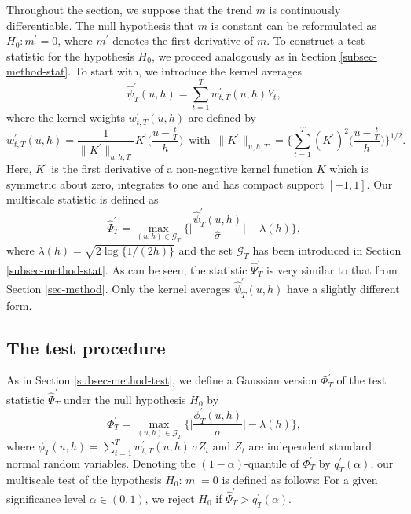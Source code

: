 \documentclass[a4paper,12pt]{article}
\numberwithin{equation}{section}
\begin{document}
Throughout the section, we suppose that the trend $m$ is continuously differentiable. The null hypothesis that $m$ is constant can be reformulated as $H_0: m^\prime = 0$, where $m^\prime$ denotes the first derivative of $m$. To construct a test statistic for the hypothesis $H_0$, we proceed analogously as in Section \ref{subsec-method-stat}. To start with, we introduce the kernel averages 
\begin{equation*}
\widehat{\psi}_T^\prime(u,h) = \sum\limits_{t=1}^T w_{t,T}^\prime(u,h) Y_t, 
\end{equation*}
where the kernel weights $w_{t,T}^\prime(u,h)$ are defined by 
\begin{equation*}
w_{t,T}^\prime(u,h) = \frac{1}{\|K^\prime\|_{u,h,T}} K^\prime\Big( \frac{u - \frac{t}{T}}{h} \Big) \, \, \, \text{with} \, \, \, \|K^\prime\|_{u,h,T} = \Big\{\sum\limits_{t=1}^T  (K^\prime)^2\Big( \frac{u - \frac{t}{T}}{h} \Big)\Big\}^{1/2}.
\end{equation*}
Here, $K^\prime$ is the first derivative of a non-negative kernel function $K$ which is symmetric about zero, integrates to one and has compact support $[-1,1]$. 
Our multiscale statistic is defined as 
\[ \widehat{\Psi}_T^\prime = \max_{(u,h) \in \mathcal{G}_T} \Big\{ \Big|\frac{\widehat{\psi}_T^\prime(u,h)}{\widehat{\sigma}}\Big| - \lambda(h) \Big\}, \] 
where $\lambda(h) = \sqrt{2 \log \{ 1/(2h) \}}$ and the set $\mathcal{G}_T$ has been introduced in Section \ref{subsec-method-stat}. As can be seen, the statistic $\widehat{\Psi}_T^\prime$ is very similar to that from Section \ref{sec-method}. Only the kernel averages $\widehat{\psi}_T^\prime(u,h)$ have a slightly different form. 


\subsection{The test procedure}\label{subsec-test-shape-test}


As in Section \ref{subsec-method-test}, we define a Gaussian version $\Phi_T^\prime$ of the test statistic $\widehat{\Psi}_T^\prime$ under the null hypothesis $H_0$ by
\[ \Phi_T^\prime = \max_{(u,h) \in \mathcal{G}_T} \Big\{ \Big|\frac{\phi_T^\prime(u,h)}{\sigma}\Big| - \lambda(h) \Big\}, \] 
where $\phi_T^\prime(u,h) = \sum\nolimits_{t=1}^T w_{t,T}^\prime(u,h) \, \sigma Z_t$ and $Z_t$ are independent standard normal random variables. Denoting the $(1-\alpha)$-quantile of $\Phi_T^\prime$ by $q_T^\prime(\alpha)$, our multiscale test of the hypothesis $H_0$: $m^\prime = 0$ is defined as follows: For a given significance level $\alpha \in (0,1)$, we reject $H_0$ if $\widehat{\Psi}_T^\prime > q_T^\prime(\alpha)$. 
\end{document}
